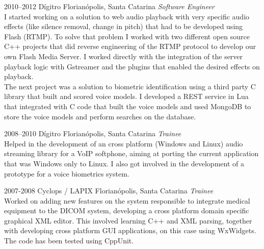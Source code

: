 \documentclass[]{friggeri-cv} %
\begin{document}
\begin{entrylist}
\entry
{2010--2012}
{Dígitro}
{Florianópolis, Santa Catarina}
{\emph{Software Engineer} \\

I started working on a solution to web audio playback
with very specific audio effects (like silence removal,
change in pitch) that had to be developed using Flash (RTMP).
To solve that problem I worked with
two different open source C++ projects that did reverse
engineering of the RTMP protocol to develop our own
Flash Media Server. I worked directly with the integration
of the server playback logic with Gstreamer and the plugins
that enabled the desired effects on playback. \\

The next project was a solution to biometric identification
using a third party C library that built and scored voice models.
I developed a REST service in Lua that integrated with C code
that built the voice models and used MongoDB to store the
voice models and perform searches on the database. \\
}
\end{entrylist}
\begin{entrylist}
\entry
{2008--2010}
{Dígitro}
{Florianópolis, Santa Catarina}
{\emph{Trainee} \\

Helped in the development of an
cross platform (Windows and Linux) audio streaming
library for a VoIP softphone, aiming at porting
the current application that was Windows only to Linux. I also
got involved in the development of a prototype for a voice
biometrics system.
}
\end{entrylist}
\begin{entrylist}
\entry
{2007-2008}
{Cyclops / LAPIX}
{Florianópolis, Santa Catarina}
{\emph{Trainee} \\

Worked on adding new features on the system responsible to
integrate medical equipment to the DICOM system, developing a
cross platform domain specific graphical XML editor.
This involved learning C++ and XML parsing, together with
developing cross platform GUI applications, on this case
using WxWidgets. The code has been tested using CppUnit.
}
\end{entrylist}
\end{document}
